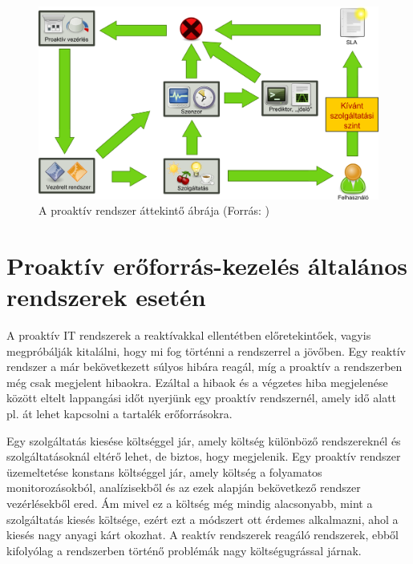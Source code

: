 \begin{figure}[h!]
\centering
\includegraphics[width=1.00\textwidth]{figures/proactive_system.png}
\caption{A proaktív rendszer áttekintő ábrája (Forrás: \cite{patariczapro}) \label{fig:proactive_system}}
\end{figure}

\section{Proaktív erőforrás-kezelés általános rendszerek esetén}

A proaktív IT rendszerek a reaktívakkal ellentétben előretekintőek, vagyis megpróbálják kitalálni, hogy mi fog történni a rendszerrel a jövőben. Egy reaktív rendszer a már bekövetkezett súlyos hibára reagál, míg a proaktív a rendszerben még csak megjelent hibaokra. Ezáltal a hibaok és a végzetes hiba megjelenése között eltelt lappangási időt nyerjünk egy proaktív rendszernél, amely idő alatt pl. át lehet kapcsolni a tartalék erőforrásokra.


Egy szolgáltatás kiesése költséggel jár, amely költség különböző rendszereknél és szolgáltatásoknál eltérő lehet, de biztos, hogy megjelenik. Egy proaktív rendszer üzemeltetése konstans költséggel jár, amely költség a folyamatos monitorozásokból, analízisekből és az ezek alapján bekövetkező rendszer vezérlésekből ered. Ám mivel ez a költség még mindig alacsonyabb, mint a szolgáltatás kiesés költsége, ezért ezt a módszert ott érdemes alkalmazni, ahol a kiesés nagy anyagi kárt okozhat. A reaktív rendszerek reagáló rendszerek, ebből kifolyólag a rendszerben történő problémák nagy költségugrással járnak.


